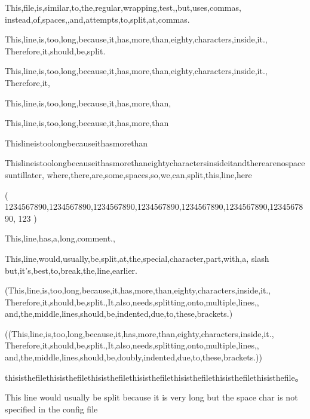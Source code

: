 \documentclass{article}
\begin{document}
This,file,is,similar,to,the,regular,wrapping,test,,but,uses,commas,
instead,of,spaces,,and,attempts,to,split,at,commas.

This,line,is,too,long,because,it,has,more,than,eighty,characters,inside,it.,
Therefore,it,should,be,split.

This,line,is,too,long,because,it,has,more,than,eighty,characters,inside,it.,
Therefore,it,%

This,line,is,too,long,because,it,has,more,than,%

This,line,is,too,long,because,it,has,more,than%

Thislineistoolongbecauseithasmorethan%

Thislineistoolongbecauseithasmorethaneightycharactersinsideitandtherearenospacesuntillater,
where,there,are,some,spaces,so,we,can,split,this,line,here

(
  1234567890,1234567890,1234567890,1234567890,1234567890,1234567890,1234567890,
  123
)

This,line,has,a,long,comment.,%


This,line,would,usually,be,split,at,the,special,character,part,with,a,
slash\,but,it's,best,to,break,the,line,earlier.

(This,line,is,too,long,because,it,has,more,than,eighty,characters,inside,it.,
  Therefore,it,should,be,split.,It,also,needs,splitting,onto,multiple,lines,,
and,the,middle,lines,should,be,indented,due,to,these,brackets.)

((This,line,is,too,long,because,it,has,more,than,eighty,characters,inside,it.,
    Therefore,it,should,be,split.,It,also,needs,splitting,onto,multiple,lines,,
and,the,middle,lines,should,be,doubly,indented,due,to,these,brackets.))

thisisthefilethisisthefilethisisthefilethisisthefilethisisthefilethisisthefilethisisthefile。

This line would usually be split because it is very long but the space char is not specified in the config file
\end{document}

